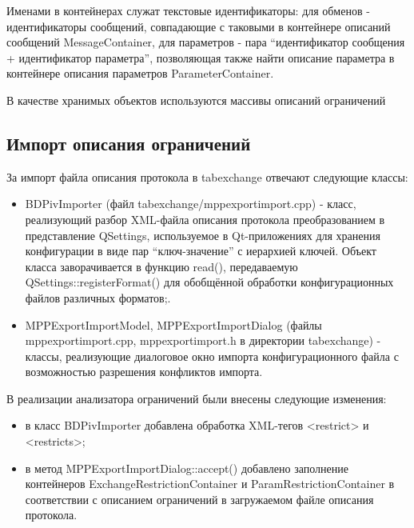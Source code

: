Именами в контейнерах служат текстовые идентификаторы: для обменов - 
идентификаторы сообщений, совпадающие с таковыми в контейнере описаний 
сообщений MessageContainer, для параметров - пара ``идентификатор сообщения + 
идентификатор параметра'', позволяющая также найти описание параметра в 
контейнере описания параметров ParameterContainer.

В качестве хранимых объектов используются массивы описаний ограничений

\subsection{Импорт описания ограничений}

За импорт файла описания протокола в tabexchange отвечают следующие классы:

\begin{itemize}
 \item BDPivImporter (файл tabexchange/mppexportimport.cpp) - класс, 
реализующий разбор XML-файла описания протокола преобразованием в представление 
QSettings, используемое в Qt-приложениях для хранения конфигурации в виде пар 
``ключ-значение'' с иерархией ключей. Объект класса заворачивается в функцию 
read(), передаваемую QSettings::registerFormat() для обобщённой обработки 
конфигурационных файлов различных форматов;.
 \item MPPExportImportModel, MPPExportImportDialog (файлы 
mppexportimport.cpp, mppexportimport.h в директории tabexchange) - классы, 
реализующие диалоговое окно импорта конфигурационного файла с возможностью 
разрешения конфликтов импорта.
\end{itemize}

В реализации анализатора ограничений были внесены следующие изменения:

\begin{itemize}
\item в класс BDPivImporter добавлена обработка XML-тегов <restrict> и 
<restricts>;
\item в метод MPPExportImportDialog::accept() добавлено заполнение контейнеров 
ExchangeRestrictionContainer и ParamRestrictionContainer в соответствии с 
описанием ограничений в загружаемом файле описания протокола.
\end{itemize}

